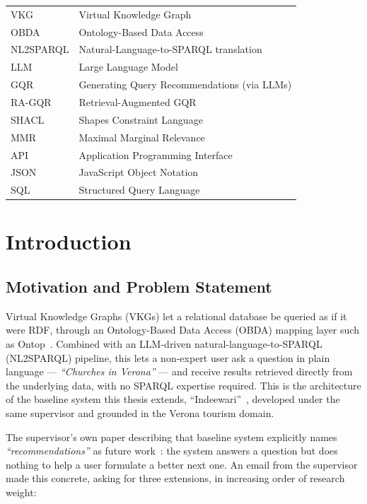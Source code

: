 \documentclass[11pt,a4paper,oneside]{book}
\begin{document}
\begin{tabular}{ll}
VKG      & Virtual Knowledge Graph \\
OBDA     & Ontology-Based Data Access \\
NL2SPARQL & Natural-Language-to-SPARQL translation \\
LLM      & Large Language Model \\
GQR      & Generating Query Recommendations (via LLMs) \\
RA-GQR   & Retrieval-Augmented GQR \\
SHACL    & Shapes Constraint Language \\
MMR      & Maximal Marginal Relevance \\
API      & Application Programming Interface \\
JSON     & JavaScript Object Notation \\
SQL      & Structured Query Language \\
\end{tabular}

\mainmatter

\chapter{Introduction}
\label{ch:intro}

\section{Motivation and Problem Statement}
\label{sec:intro-motivation}

Virtual Knowledge Graphs (VKGs) let a relational database be queried as if it were RDF, through an
Ontology-Based Data Access (OBDA) mapping layer such as Ontop~\cite{ontop}. Combined with an
LLM-driven natural-language-to-SPARQL (NL2SPARQL) pipeline, this lets a non-expert user ask a
question in plain language --- \emph{``Churches in Verona''} --- and receive results retrieved
directly from the underlying data, with no SPARQL expertise required. This is the architecture of
the baseline system this thesis extends, ``Indeewari''~\cite{balasooriya2026}, developed under the
same supervisor and grounded in the Verona tourism domain.

The supervisor's own paper describing that baseline system explicitly names
\emph{``recommendations''} as future work~\cite{balasooriya2026}: the system answers a question but
does nothing to help a user formulate a better next one. An email from the supervisor made this
concrete, asking for three extensions, in increasing order of research weight:
\end{document}
